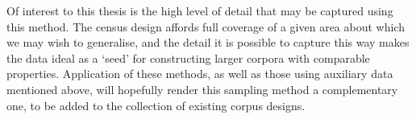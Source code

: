 Of interest to this thesis is the high level of detail that may be captured using this method.  The census design affords full coverage of a given area about which we may wish to generalise, and the detail it is possible to capture this way makes the data ideal as a `seed' for constructing larger corpora with comparable properties.  Application of these methods, as well as those using auxiliary data mentioned above, will hopefully render this sampling method a complementary one, to be added to the collection of existing corpus designs.

